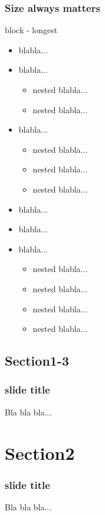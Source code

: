 \documentclass[slidestop,compress,9pt,aspectratio=43]{beamer}
\begin{document}
\begin{frame}
\frametitle{Size always matters}
\begin{block}{block - longest}
  \begin{itemize}
    \item blabla...
    \item blabla...
    \begin{itemize}
      \item nested blabla...
      \item nested blabla...
    \end{itemize}
    \item blabla...
    \begin{itemize}
    \item nested blabla...
    \item nested blabla...
    \item nested blabla...
    \end{itemize}
    \item blabla...
    \item blabla...
    \item blabla...
    \begin{itemize}
    \item nested blabla...
    \item nested blabla...
    \item nested blabla...
    \item nested blabla...
    \end{itemize}
  \end{itemize}
\end{block}
\end{frame}

\subsection{Section1-3}
\begin{frame}
\frametitle{slide title}
Bla bla bla...
\end{frame}



\section{Section2}
\begin{frame}
\frametitle{slide title}
Bla bla bla...
\end{frame}
\end{document}
